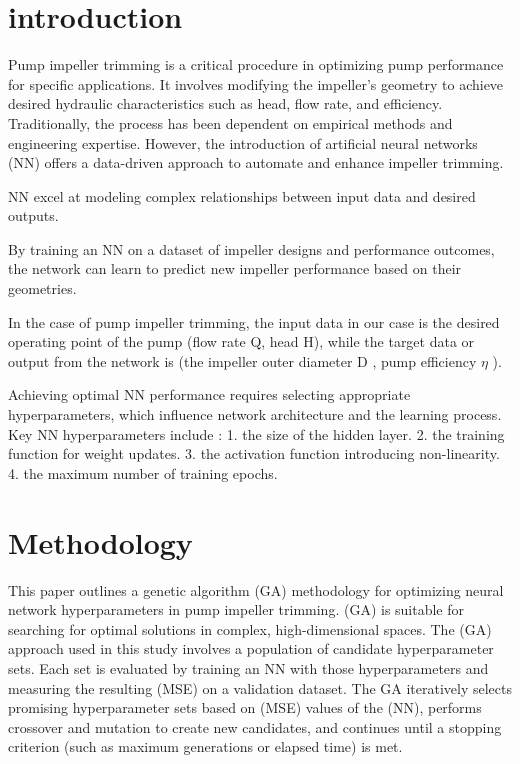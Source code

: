 \documentclass[
  super,
  review,
  3p]{elsarticle}
\begin{document}
\section{introduction}\label{introduction}

Pump impeller trimming is a critical procedure in optimizing pump
performance for specific applications. It involves modifying the
impeller's geometry to achieve desired hydraulic characteristics such as
head, flow rate, and efficiency. Traditionally, the process has been
dependent on empirical methods and engineering expertise. However, the
introduction of artificial neural networks (NN) offers a data-driven
approach to automate and enhance impeller trimming.

NN excel at modeling complex relationships between input data and
desired outputs.

By training an NN on a dataset of impeller designs and performance
outcomes, the network can learn to predict new impeller performance
based on their geometries.

In the case of pump impeller trimming, the input data in our case is the
desired operating point of the pump (flow rate Q, head H), while the
target data or output from the network is (the impeller outer diameter D
, pump efficiency \(\eta\) ).

Achieving optimal NN performance requires selecting appropriate
hyperparameters, which influence network architecture and the learning
process. Key NN hyperparameters include : 1. the size of the hidden
layer. 2. the training function for weight updates. 3. the activation
function introducing non-linearity. 4. the maximum number of training
epochs.

\section{Methodology}\label{methodology}

This paper outlines a genetic algorithm (GA) methodology for optimizing
neural network hyperparameters in pump impeller trimming. (GA) is
suitable for searching for optimal solutions in complex,
high-dimensional spaces. The (GA) approach used in this study involves a
population of candidate hyperparameter sets. Each set is evaluated by
training an NN with those hyperparameters and measuring the resulting
(MSE) on a validation dataset. The GA iteratively selects promising
hyperparameter sets based on (MSE) values of the (NN), performs
crossover and mutation to create new candidates, and continues until a
stopping criterion (such as maximum generations or elapsed time) is met.
\end{document}
